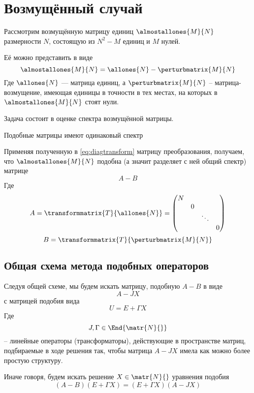 \section{Возмущённый случай}

Рассмотрим возмущённую матрицу единиц
\( \almostallones{M}{N} \) размерности \( N \),
состоящую из \( N^2 - M \) единиц и \( M \) нулей.

Её можно представить в виде
\[
    \almostallones{M}{N} = \allones{N} - \perturbmatrix{M}{N}
    \]
Где \( \allones{N} \) --- матрица единиц,
а \( \perturbmatrix{M}{N} \) -- матрица-возмущение,
имеющая единицы в точности в тех местах,
на которых в \( \almostallones{M}{N} \) стоят нули.

Задача состоит в оценке спектра возмущённой матрицы.

\begin{propose}
    Подобные матрицы имеют одинаковый спектр
\end{propose}

Применяя полученную в \eqref{eq:diagtransform} матрицу преобразования,
получаем, что \( \almostallones{M}{N} \) подобна (а значит разделяет с ней общий спектр)
матрице
\[ A - B \]
Где
\[
    A = \transformmatrix{T}{\allones{N}}
    = \begin{pmatrix}
    N &   &        & \\
        & 0 &        & \\
        &   & \ddots & \\
        &   &        & 0
        \end{pmatrix}
        \]
\[
    B = \transformmatrix{T}{\perturbmatrix{M}{N}}
    \]

\subsection{Общая схема метода подобных операторов}
Следуя общей схеме, мы будем искать матрицу, подобную \( A - B \)
в виде
\[ A - J X \]
с матрицей подобия вида
\[ U = E + \Gamma X \]
Где \[ J, \Gamma \in \End{\matr{N}{}} \]
-- линейные операторы (трансформаторы), действующие в пространстве матриц,
подбираемые в ходе решения так, чтобы матрица \( A - JX \)
имела как можно более простую структуру.

Иначе говоря, будем искать решение \( X \in\matr{N}{} \)
уравнения подобия
\begin{equation}\label{eq:similarity-orig}
    (A - B)(E+\Gamma X) = (E+\Gamma X) (A - JX)
\end{equation}

